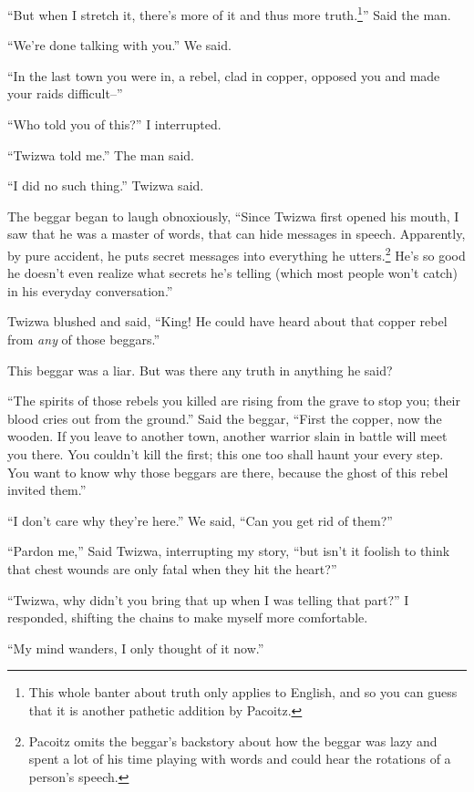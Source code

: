 ``But when I stretch it, there's more of it and thus more truth.\footnote{This whole banter about truth only applies to English, and so you can guess that it is another pathetic addition by Pa\-co\-itz.}'' Said the man.

``We're done talking with you.'' We said.

``In the last town you were in, a rebel, clad in copper, opposed you and made your raids difficult--''

``Who told you of this?'' I interrupted.

``Twi\-zwa told me.'' The man said.

``I did no such thing.'' Twi\-zwa said.

The beggar began to laugh obnoxiously, ``Since Twi\-zwa first opened his mouth, I saw that he was a master of words, that can hide messages in speech. Apparently, by pure accident, he puts secret messages into everything he utters.\footnote{Pa\-co\-itz omits the beggar's backstory about how the beggar was lazy and spent a lot of his time playing with words and could hear the rotations of a person's speech.} He's so good he doesn't even realize what secrets he's telling (which most people won't catch) in his everyday conversation.''

Twi\-zwa blushed and said, ``King! He could have heard about that copper rebel from \emph{any} of those beggars.''

This beggar was a liar. But was there any truth in anything he said?

``The spirits of those rebels you killed are rising from the grave to stop you; their blood cries out from the ground.'' Said the beggar, ``First the copper, now the wooden. If you leave to another town, another warrior slain in battle will meet you there. You couldn't kill the first; this one too shall haunt your every step. You want to know why those beggars are there, because the ghost of this rebel invited them.''
 
``I don't care why they're here.'' We said, ``Can you get rid of them?''

\tbreak

``Pardon me,'' Said Twi\-zwa, interrupting my story, ``but isn't it foolish to think that chest wounds are only fatal when they hit the heart?''

``Twi\-zwa, why didn't you bring that up when I was telling that part?'' I responded, shifting the chains to make myself more comfortable.

``My mind wanders, I only thought of it now.''

